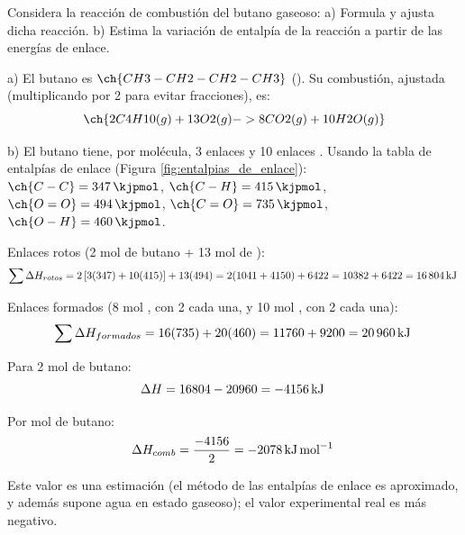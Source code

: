 \begin{exercise}
    Considera la reacción de combustión del butano gaseoso:
    a) Formula y ajusta dicha reacción.
    b) Estima la variación de entalpía de la reacción a partir de las energías de enlace.


    \begin{solu}


        a) El butano es \(\ch{CH3-CH2-CH2-CH3}\) (). Su combustión, ajustada (multiplicando por 2 para evitar fracciones), es:
        \[
            \ch{2 C4H10 (g) + 13 O2 (g) -> 8 CO2 (g) + 10 H2O (g)}
        \]

        b) El butano tiene, por molécula, 3 enlaces  y 10 enlaces . Usando la tabla de entalpías de enlace (Figura \ref{fig:entalpias_de_enlace}): \(\ch{C-C}=\SI{347}{\kjpmol}\), \(\ch{C-H}=\SI{415}{\kjpmol}\), \(\ch{O=O}=\SI{494}{\kjpmol}\), \(\ch{C=O}=\SI{735}{\kjpmol}\), \(\ch{O-H}=\SI{460}{\kjpmol}\).

        Enlaces rotos (2 mol de butano + 13 mol de ):
        \[
            \sum \Delta H_{rotos} = 2\left[3(347)+10(415)\right] + 13(494) = 2(1041+4150)+6422 = 10382+6422 = \energia[kj]{16804}
        \]

        Enlaces formados (8 mol , con 2  cada una, y 10 mol , con 2  cada una):
        \[
            \sum \Delta H_{formados} = 16(735)+20(460) = 11760+9200 = \energia[kj]{20960}
        \]

        Para 2 mol de butano:
        \[
            \Delta H = 16804-20960 = \energia[kj]{-4156}
        \]

        Por mol de butano:
        \[
            \Delta H_{comb} = \frac{-4156}{2} = \energia[kjmol]{-2078}
        \]

        Este valor es una estimación (el método de las entalpías de enlace es aproximado, y además supone agua en estado gaseoso); el valor experimental real es más negativo.
    \end{solu}
\end{exercise}
